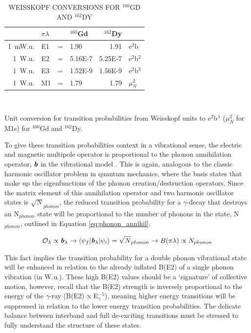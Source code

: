 \begin{table}[ht]
\centering
\caption{WEISSKOPF CONVERSIONS FOR $^{160}$GD AND $^{162}$DY \label{tab:Weisskopf_conversion}}

\begin{tabular}{rlcl|r|l}
 & $\pi\lambda$ &&  $^{160}$Gd & $^{162}$Dy \\ \hline\hline
1~mW.u.& E1 & = & 1.90    & 1.91    & e$^2$b\\
1~W.u. & E2 & = & 5.16E-7 & 5.25E-7 & e$^2$b$^2$\\
1~W.u. & E3 & = & 1.52E-9 & 1.56E-9 & e$^2$b$^3$ \\
1~W.u. & M1 & = & 1.79    & 1.79    & $\mu_N^2$ \\
\end{tabular}\\
\vspace{10pt}
\begin{normalsize}
Unit conversion for transition probabilities from Weisskopf units to e$^2$b$^\lambda$ ($\mu_N^2$ for M1s) for $^{160}$Gd and $^{162}$Dy.
\end{normalsize}
\end{table}

To give these transition probabilities context in a vibrational sense, the electric and magnetic multipole operator is proportional to the phonon annihilation operator, $\textit{\textbf{b}}$ in the vibrational model \cite{Wong_text}. This is again, analogous to the classic harmonic oscillator problem in quantum mechanics, where the basis states that make up the eigenfunctions of the phonon creation/destruction operators. Since the matrix element of this annihilation operator and two harmonic oscillator states is $\sqrt N_{phonon}$, the reduced transition probability for a $\gamma$-decay that destroys an N$_{phonon}$ state will be proportional to the number of phonons in the state, N$_{phonon}$, outlined in Equation \ref{eq:phonon_annihil}.

\begin{equation}\label{eq:phonon_annihil}
\mathcal{O}_\lambda\propto\textbf{\textit{b}}_\lambda\rightarrow \langle\psi_f\vert\textbf{\textit{b}}_\lambda\vert\psi_i\rangle=\sqrt N_{phonon}\rightarrow B(\pi\lambda)\propto N_{phonon}
\end{equation}

This fact implies the transition probability for a double phonon vibrational state will be enhanced in relation to the already inflated B(E2) of a single phonon vibration (in W.u.). These high B(E2) values should be a `signature' of collective motion, however, recall that the B(E2) strength is inversely proportional to the energy of the $\gamma$-ray (B(E2)$\propto$E$_\gamma^{-5}$), meaning higher energy transitions will be suppressed in relation to the lower energy transition probabilities. The delicate balance between interband and full de-exciting transitions must be stressed to fully understand the structure of these states. 

